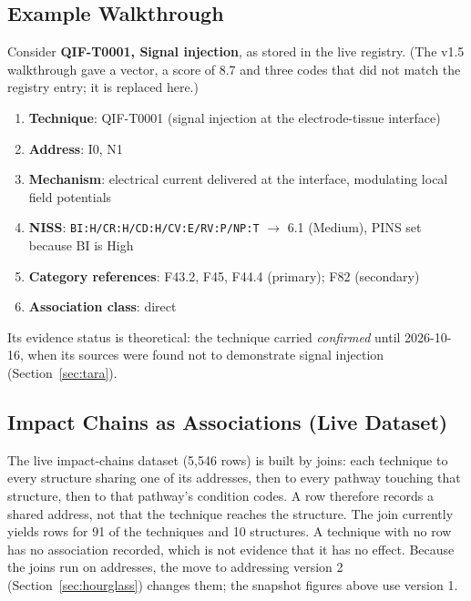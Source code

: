 \subsection{Example Walkthrough}

Consider \textbf{QIF-T0001, Signal injection}, as stored in the live registry. (The v1.5
walkthrough gave a vector, a score of 8.7 and three codes that did not match the registry
entry; it is replaced here.)

\begin{enumerate}
  \item \textbf{Technique}: QIF-T0001 (signal injection at the electrode-tissue interface)
  \item \textbf{Address}: I0, N1
  \item \textbf{Mechanism}: electrical current delivered at the interface, modulating
        local field potentials
  \item \textbf{NISS}: \texttt{BI:H/CR:H/CD:H/CV:E/RV:P/NP:T} $\to$ 6.1 (Medium), PINS
        set because BI is High
  \item \textbf{Category references}: F43.2, F45, F44.4 (primary); F82 (secondary)
  \item \textbf{Association class}: direct
\end{enumerate}

\noindent Its evidence status is theoretical: the technique carried \emph{confirmed} until
2026-10-16, when its sources were found not to demonstrate signal injection
(Section~\ref{sec:tara}).

\subsection{Impact Chains as Associations (Live Dataset)}

The live impact-chains dataset (5,546 rows) is built by joins: each technique to every
structure sharing one of its addresses, then to every pathway touching that structure, then
to that pathway's condition codes. A row therefore records a shared address, not that the
technique reaches the structure. The join currently yields rows for 91 of the
\LiveTechniques{} techniques and 10 structures. A technique with no row has no association
recorded, which is not evidence that it has no effect. Because the joins run on addresses,
the move to addressing version 2 (Section~\ref{sec:hourglass}) changes them; the snapshot
figures above use version 1.

